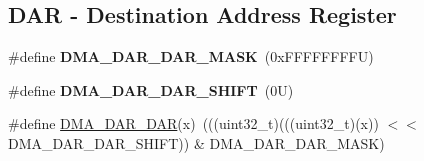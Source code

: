 \subsection*{D\+AR -\/ Destination Address Register}
\begin{DoxyCompactItemize}
\item 
\mbox{\label{group___d_m_a___register___masks_gad24e68800bcb03e0d2ffad9b026d5c28}} 
\#define {\bfseries D\+M\+A\+\_\+\+D\+A\+R\+\_\+\+D\+A\+R\+\_\+\+M\+A\+SK}~(0x\+F\+F\+F\+F\+F\+F\+F\+F\+U)
\item 
\mbox{\label{group___d_m_a___register___masks_ga6dc575769385f559893116dabe37a002}} 
\#define {\bfseries D\+M\+A\+\_\+\+D\+A\+R\+\_\+\+D\+A\+R\+\_\+\+S\+H\+I\+FT}~(0\+U)
\item 
\#define \mbox{\hyperlink{group___d_m_a___register___masks_ga61f5171a3627441884096a69a3f33ca5}{D\+M\+A\+\_\+\+D\+A\+R\+\_\+\+D\+AR}}(x)~(((uint32\+\_\+t)(((uint32\+\_\+t)(x)) $<$$<$ D\+M\+A\+\_\+\+D\+A\+R\+\_\+\+D\+A\+R\+\_\+\+S\+H\+I\+FT)) \& D\+M\+A\+\_\+\+D\+A\+R\+\_\+\+D\+A\+R\+\_\+\+M\+A\+SK)
\end{DoxyCompactItemize}
